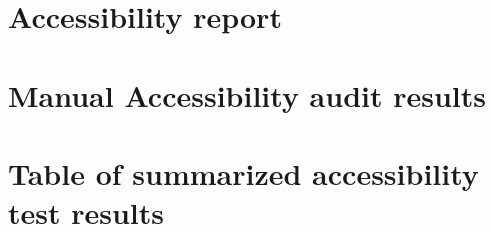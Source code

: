 \documentclass{master_thesis}
\begin{document}
\section{Accessibility report}\label{appendix:report}


\section{Manual Accessibility audit results}\label{appendix:manual-audit}

\section{Table of summarized accessibility test results}\label{appendix:results-table}

\end{document}
